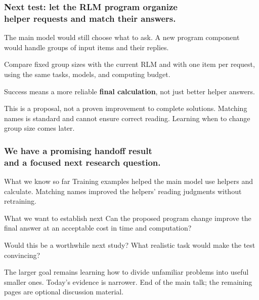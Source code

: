 \documentclass[aspectratio=169,11pt]{beamer}
\newcommand{\smallnote}[1]{\vfill{\scriptsize\color{Muted}#1\par}}
\begin{document}
\begin{frame}[t]
\frametitle{Next test: let the RLM program organize\\helper requests and match their answers.}
The main model would still choose what to ask. A new program component would handle groups of input items and their replies.\par
\vspace{4mm}
\centering
{}
\par\vspace{5mm}
\raggedright
Compare fixed group sizes with the current RLM and with one item per request, using the same tasks, models, and computing budget.
\par\vspace{3mm}
Success means a more reliable \textbf{final calculation}, not just better helper answers.
\smallnote{This is a proposal, not a proven improvement to complete solutions. Matching names is standard and cannot ensure correct reading. Learning when to change group size comes later.}
\end{frame}

\begin{frame}[t]
\frametitle{We have a promising handoff result\\and a focused next research question.}
\begin{block}{What we know so far}
Training examples helped the main model use helpers and calculate. Matching names improved the helpers' reading judgments without retraining.
\end{block}
\vspace{2mm}
\begin{block}{What we want to establish next}
Can the proposed program change improve the final answer at an acceptable cost in time and computation?
\end{block}
\vspace{3mm}
{\large Would this be a worthwhile next study? What realistic task would make the test convincing?}
\smallnote{The larger goal remains learning how to divide unfamiliar problems into useful smaller ones. Today's evidence is narrower. End of the main talk; the remaining pages are optional discussion material.}
\end{frame}
\end{document}
